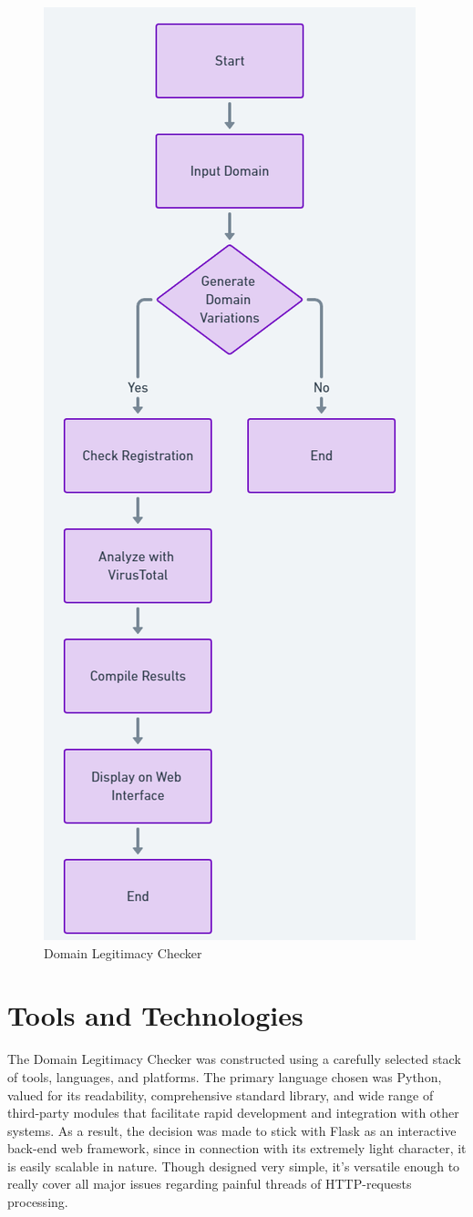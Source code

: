 \begin{figure}[H]
    \centering
    \includegraphics[width=0.6\linewidth]{project/DNS Abuse Inspector Operational Flowchart.png}
    \caption{Domain Legitimacy Checker}
    \label{fig:figfigfig}
\end{figure}
\newpage


\section{Tools and Technologies}

The Domain Legitimacy Checker was constructed using a carefully selected stack of tools, languages, and platforms. The primary language chosen was Python, valued for its readability, comprehensive standard library, and wide range of third-party modules that facilitate rapid development and integration with other systems. As a result, the decision was made to stick with Flask as an interactive back-end web framework, since in connection with its extremely light character, it is easily scalable in nature. Though designed very simple, it's versatile enough to really cover all major issues regarding painful threads of HTTP-requests processing.

